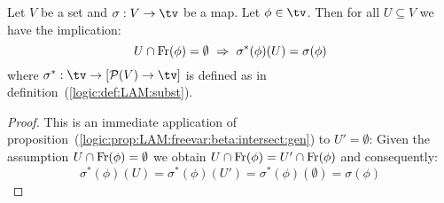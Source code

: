 \begin{prop}\label{logic:prop:LAM:freevar:beta:intersect}
    Let $V$ be a set and $\sigma:V\to\tv$ be a map. Let $\phi\in\tv$.
    Then for all $U\subseteq V$ we have the implication:
        \[
            U\cap\free(\phi) = \emptyset
            \ \Rightarrow\ 
            \sigma^{*}(\phi)(U) = \sigma(\phi)
        \]
    where $\sigma^{*}:\tv\to[{\cal P}(V)\to\tv]$ is defined as in 
    definition~(\ref{logic:def:LAM:subst}).
\end{prop}
\begin{proof}
    This is an immediate application of 
    proposition~(\ref{logic:prop:LAM:freevar:beta:intersect:gen}) 
    to $U'=\emptyset$: Given the assumption $U\cap\mbox{\rm Fr}(\phi) = \emptyset$ 
    we obtain $U\cap\mbox{\rm Fr}(\phi)=U'\cap\mbox{\rm Fr}(\phi)$ and consequently:
        \[
            \sigma^{*}(\phi)(U)=\sigma^{*}(\phi)(U')
            =\sigma^{*}(\phi)(\emptyset)=\sigma(\phi)
        \]
\end{proof}

